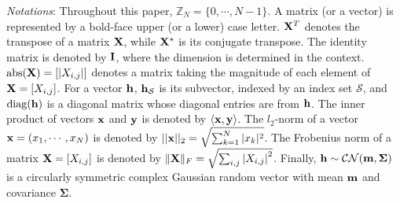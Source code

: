 \documentclass[journal]{IEEEtran}
\newcommand{\Z}{\ensuremath{\mathbb Z}}
\newcommand{\mS}{\mathcal{S}}
\newcommand{\hbu}{{\bf h}}
\newcommand{\xbu}{{\bf x}}
\newcommand{\ybu}{{\bf y}}
\newcommand{\Ibu}{{\bf I}}
\newcommand{\Xbu}{{\bf X}}
\numberwithin{const2}{const}
\begin{document}
\emph{Notations}: 
Throughout this paper, $\Z_N = \{0, \cdots, N-1\}$.
A matrix (or a vector) is represented by
a bold-face upper (or a lower) case letter.
$\Xbu^T$ denotes the transpose of a matrix $\Xbu$, 
while 
$\Xbu^*$ is its conjugate transpose. %
The identity matrix is denoted by $\Ibu$, where the dimension is determined in the context.
$ {\rm abs} (\Xbu) = [ | X_{i, j} | ]$
denotes a matrix taking the magnitude of each element of $\Xbu =  [X_{i,j}]$.
For a vector $\hbu $, 
$\hbu_{\mS}$ is its subvector, indexed by an index set $\mS$, and
${\rm diag} (\hbu)$ is a diagonal matrix whose diagonal entries are from $\hbu$.
The inner product of vectors $\xbu$ and $\ybu$ is denoted by $\langle \xbu, \ybu \rangle$.
The $l_2$-norm of a vector $\xbu  = (x_1, \cdots, x_N)$ is denoted by
$ || \xbu ||_{2} = \sqrt{ \sum_{k=1} ^{N} |x_k|^2 } $.
The Frobenius norm of a matrix $\Xbu = [X_{i,j}]$ is denoted by 
$\| \Xbu \|_F = \sqrt{\sum_{i, j} \left| X_{i,j} \right| ^2 }$.
Finally, $\hbu \sim \mathcal{CN} (\mathbf{m}, \mathbf{\Sigma})$ is a circularly symmetric complex Gaussian random vector
with mean $\bf m$ and covariance $\mathbf{\Sigma}$.
\end{document}
